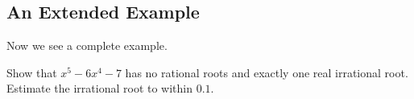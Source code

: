 \subsection{An Extended Example} 
Now we see a complete example.
\begin{example}
Show that $x^5-6x^4-7$ has no rational roots and exactly one real irrational root. Estimate the irrational root to within $0.1$.
\fillpaper
\end{example}